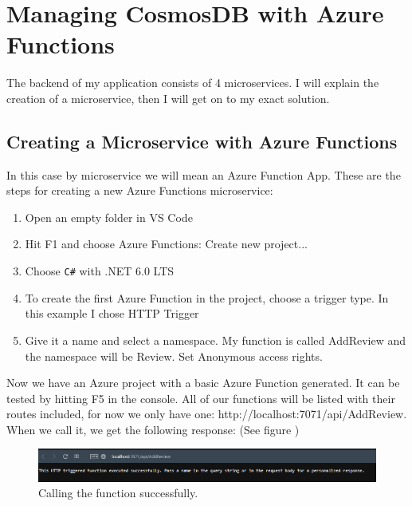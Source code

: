 \chapter{Managing CosmosDB with Azure Functions}\label{Ch4}

The backend of my application consists of 4 microservices. I will explain the creation of a microservice, then I will get on to my exact solution.  
\section{Creating a Microservice with Azure Functions}
In this case by microservice we will mean an Azure Function App. 
These are the steps for creating a new Azure Functions microservice: \cite{VSCodeFunction}

\begin{enumerate}
	\item Open an empty folder in VS Code
	\item Hit F1 and choose Azure Functions: Create new project...
	\item Choose \verb+C#+ with .NET 6.0 LTS
	\item To create the first Azure Function in the project, choose a trigger type. In this example I chose HTTP Trigger
	\item Give it a name and select a namespace. My function is called AddReview and the namespace will be Review. Set Anonymous access rights.
\end{enumerate}
	
Now we have an Azure project with a basic Azure Function generated. It can be tested by hitting F5 in the console. All of our functions will be listed with their routes included, for now we only have one: http://localhost:7071/api/AddReview. When we call it, we get the following response: (See figure )

\begin{figure}[!ht]
	\centering
	\includegraphics[width=150mm, keepaspectratio]{figures/4_response.png}
	\caption{Calling the function successfully.} 
	\label{fig:res}
\end{figure}

